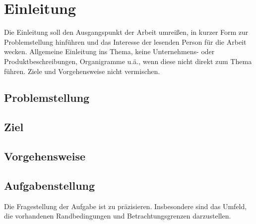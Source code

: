 
\chapter{Einleitung}
Die Einleitung soll den Ausgangspunkt der Arbeit umreißen, in kurzer Form zur Problemstellung hinführen und das Interesse der lesenden Person für die Arbeit wecken. Allgemeine Einleitung ins Thema, keine Unternehmens- oder Produktbeschreibungen, Organigramme u.ä., wenn diese nicht direkt zum Thema führen. Ziele und Vorgehensweise nicht vermischen.

\section{Problemstellung}

\section{Ziel}

\section{Vorgehensweise}

\section{Aufgabenstellung}
Die Fragestellung der Aufgabe ist zu präzisieren. Insbesondere sind das Umfeld, die vorhandenen Randbedingungen und Betrachtungsgrenzen darzustellen.
